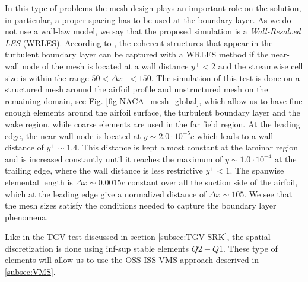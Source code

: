 In this type of problems the mesh design plays an important role on the solution, in particular, a proper spacing has to be used at the boundary layer. As we do not use a wall-law model, we say that the proposed simulation is a \textit{Wall-Resolved LES} (WRLES). According to \cite{piomelli_large-eddy_1996}, the coherent structures that appear in the turbulent boundary layer can be captured with a WRLES method if the near-wall node of the mesh is located at a wall distance $y^+<2$ and the streamwise cell size is within the range $50<\Delta x^+<150$. The simulation of this test is done on a structured mesh around the airfoil profile and unstructured mesh on the remaining domain, see Fig. \ref{fig-NACA_mesh_global}, which allow us to have fine enough elements around the airfoil surface, the turbulent boundary layer and the wake region, while coarse elements are used in the far field region. At the leading edge, the near wall-node is located at $y\sim 2.0\cdot10^{-5}c$ which leads to a wall distance of $ y^+\sim1.4$. This distance is kept almost constant at the laminar region and is increased constantly until it reaches the maximum of $y\sim1.0\cdot10^{-4}$ at the trailing edge, where the wall distance is less restrictive $y^+<1$. The spanwise elemental length is $\Delta x\sim0.0015c$ constant over all the suction side of the airfoil, which at the leading edge give a normalized distance of $\Delta x\sim105$. We see that the mesh sizes satisfy the conditions needed to capture the boundary layer phenomena.

Like in the TGV test discussed in section \ref{subsec:TGV-SRK}, the spatial discretization is done using inf-sup stable elements $Q2-Q1$. These type of elements will allow us to use the OSS-ISS VMS approach descrived in \ref{subsec:VMS}. 

